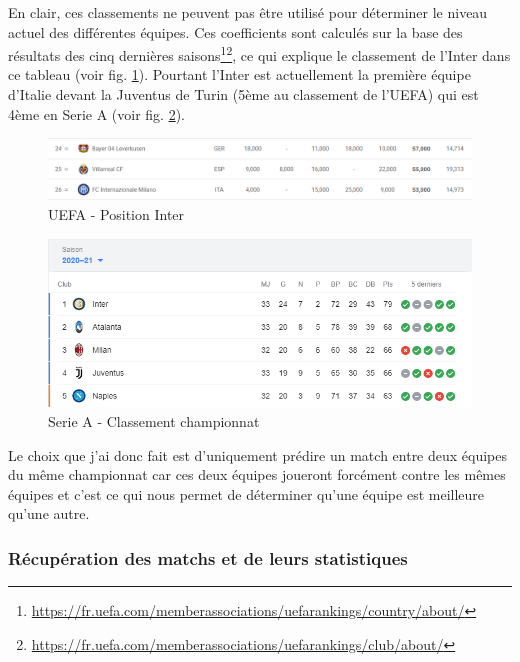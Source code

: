 \documentclass[a4paper,14pt]{extarticle}
\begin{document}
{En clair, ces classements ne peuvent pas être utilisé pour déterminer le niveau actuel des différentes équipes. Ces coefficients sont calculés sur la base des résultats des cinq dernières saisons\footnote{\url{https://fr.uefa.com/memberassociations/uefarankings/country/about/}}\footnote{\url{https://fr.uefa.com/memberassociations/uefarankings/club/about/}}, ce qui explique le classement de l'Inter dans ce tableau (voir fig. \ref{fig:classementInterUEFA}).  Pourtant l'Inter est actuellement la première équipe d'Italie devant la Juventus de Turin (5ème au classement de l'UEFA) qui est 4ème en Serie A (voir fig. \ref{fig:classementSerieA}).

\begin{figure}[htp]
    \centering
    \includegraphics[width=16cm]{../img/classementInterUEFA.png}
    \caption{UEFA - Position Inter}
    \label{fig:classementInterUEFA}
\end{figure}

\begin{figure}[htp]
    \centering
    \includegraphics[width=16cm]{../img/classementSerieA.png}
    \caption{Serie A - Classement championnat}
    \label{fig:classementSerieA}
\end{figure}



Le choix que j'ai donc fait est d'uniquement prédire un match entre deux équipes du même championnat car ces deux équipes joueront forcément contre les mêmes équipes et c'est ce qui nous permet de déterminer qu'une équipe est meilleure qu'une autre.

\newpage

\subsubsection{Récupération des matchs et de leurs statistiques}
\label{recupMatchStats}

}
\end{document}
